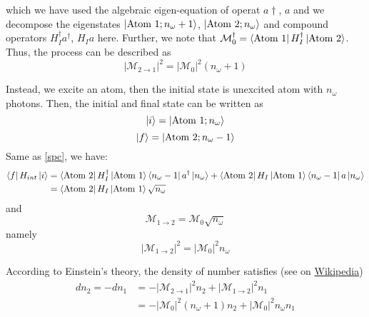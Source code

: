 \documentclass[12pt,openany]{book}
\begin{document}
	which we have used the algebraic eigen-equation of operat $a\dagger$, $a$ and we decompose the eigenstates $\ket{\text{Atom 1};n_\omega+1}$, $\ket{\text{Atom 2};n_\omega}$ and compound operators $H_I^\dagger a^\dagger$, $H_I a$ here. Further, we note that 
	$\mathcal{M}_0^\dagger=\bra{\text{Atom 1}}H_I^\dagger\ket{\text{Atom 2}}$. Thus, the process can be described as 
	\begin{equation}
		|\mathcal{M}_{2\rightarrow1}|^2=|\mathcal{M}_0|^2(n_\omega+1)
	\end{equation}\par 
	Instead, we excite an atom, then the initial state is unexcited atom with $n_\omega$ photons. Then, the initial and final state can be written as 
	\begin{equation}
			\ket{i}=\ket{\text{Atom 1};n_\omega}
	\end{equation}
	\begin{equation}
		\ket{f}=\ket{\text{Atom 2};n_\omega-1}
	\end{equation}
	Same as \eqref{spc}, we have:
	\begin{equation}
		\begin{aligned}
			\bra{f}H_{int}\ket{i}&=\bra{\text{Atom 2}}H_I^\dagger\ket{\text{Atom 1}}\bra{n_\omega-1}a^\dagger\ket{n_\omega}+\bra{\text{Atom 2}}H_I\ket{\text{Atom 1}}\bra{n_\omega-1}a\ket{n_\omega}\\
			                     &=\bra{\text{Atom 2}}H_I\ket{\text{Atom 1}}\sqrt{n_\omega}
		\end{aligned}
	\end{equation}
	and
	\begin{equation}
		\mathcal{M}_{1\rightarrow2}=\mathcal{M}_0\sqrt{n_\omega}
	\end{equation}
	namely
	\begin{equation}
		|\mathcal{M}_{1\rightarrow2}|^2=|\mathcal{M}_0|^2n_\omega
	\end{equation}\par 
	According to Einstein's theory, the density of number satisfies (see on \href{https://zh.wikipedia.org/wiki/%E8%87%AA%E5%8F%91%E8%BE%90%E5%B0%84}{Wikipedia})
	\begin{equation}
		\begin{aligned}
		 dn_2=-dn_1&=-|\mathcal{M}_{2\rightarrow1}|^2n_2+|\mathcal{M}_{1\rightarrow2}|^2n_1\\
		           &=-|\mathcal{M}_0|^2(n_\omega+1)n_2+|\mathcal{M}_0|^2n_\omega n_1
		\end{aligned}
	\end{equation}
\end{document}
